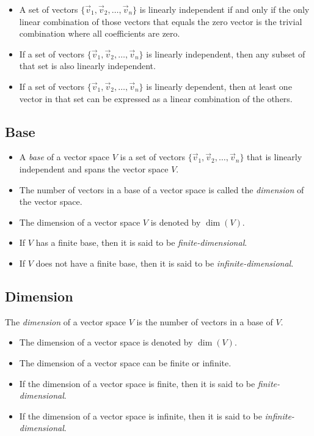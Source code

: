 \begin{itemize}[label=\(-\)]
	\item A set of vectors \(\{\vec{v}_1, \vec{v}_2, \ldots, \vec{v}_n\}\) is linearly independent if and only if the only linear combination of those vectors that equals the zero vector is the trivial combination where all coefficients are zero.
	\item If a set of vectors \(\{\vec{v}_1, \vec{v}_2, \ldots, \vec{v}_n\}\) is linearly independent, then any subset of that set is also linearly independent.
	\item If a set of vectors \(\{\vec{v}_1, \vec{v}_2, \ldots, \vec{v}_n\}\) is linearly dependent, then at least one vector in that set can be expressed as a linear combination of the others.
\end{itemize}

\subsection{Base}

\begin{itemize}[label=\(-\)]
\item A \emph{base} of a vector space \(V\) is a set of vectors \(\{\vec{v}_1, \vec{v}_2, \ldots, \vec{v}_n\}\) that is linearly independent and spans the vector space \(V\).
\item The number of vectors in a base of a vector space is called the \emph{dimension} of the vector space.
\item The dimension of a vector space \(V\) is denoted by \(\dim(V)\).
\item If \(V\) has a finite base, then it is said to be \emph{finite-dimensional}.
\item If \(V\) does not have a finite base, then it is said to be \emph{infinite-dimensional}.
\end{itemize}

\subsection{Dimension}
The \emph{dimension} of a vector space \(V\) is the number of vectors in a base of \(V\).

\begin{itemize}[label=\(-\)]
	\item The dimension of a vector space is denoted by \(\dim(V)\).
	\item The dimension of a vector space can be finite or infinite.
	\item If the dimension of a vector space is finite, then it is said to be \emph{finite-dimensional}.
	\item If the dimension of a vector space is infinite, then it is said to be \emph{infinite-dimensional}.
\end{itemize}

